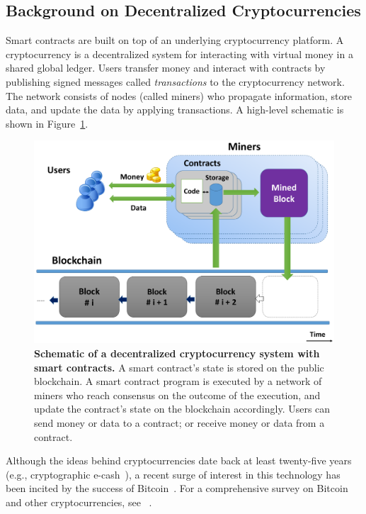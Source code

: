 \documentclass{llncs}
\newcommand{\ignore}[1]{}
\begin{document}
\subsection{Background on Decentralized Cryptocurrencies}
Smart contracts are built on top of an underlying cryptocurrency platform. A cryptocurrency is a decentralized system for interacting with virtual money in a shared global ledger. Users transfer money and interact with contracts by publishing signed messages called \emph{transactions} to the cryptocurrency network. The network consists of nodes (called miners) who propagate information, store data, and update the data by applying transactions. A high-level schematic is shown in Figure~\ref{fig:schematic}.
\begin{figure}[t]
\centering
\includegraphics[width=0.7\columnwidth]{overview_figure}
\caption{{\bf Schematic of a decentralized cryptocurrency system 
with smart contracts.}
A smart contract's state is stored on the public blockchain.
A smart contract program is executed by a 
network of miners who reach consensus on the
outcome of the execution, and update the contract's state 
on the blockchain accordingly.
Users can send money or data to a contract;
or receive money or data from a contract.
}
\label{fig:schematic}
\end{figure}

Although the ideas behind cryptocurrencies date back at least twenty-five years (e.g., cryptographic e-cash~\cite{chaum-ecash}), a recent surge of interest in this technology has been incited by the success of Bitcoin~\cite{bitcoin}. For a comprehensive survey on Bitcoin and other cryptocurrencies, see ~\cite{researchperspectives,bittertobetter}.

\ignore{We shall make some simplifying assumptions 
about the security model of the underlying cryptocurrency.
Loosely speaking, we assume that the
cryptocurrency has a secure and incentive compatible
consensus protocol. 
In reality, existing decentralized cryptocurrencies
achieve only heuristic security; designing a provably  
secure decentralized consensus protocol under
rationality assumptions is a topic of 
future research.
}
\end{document}
